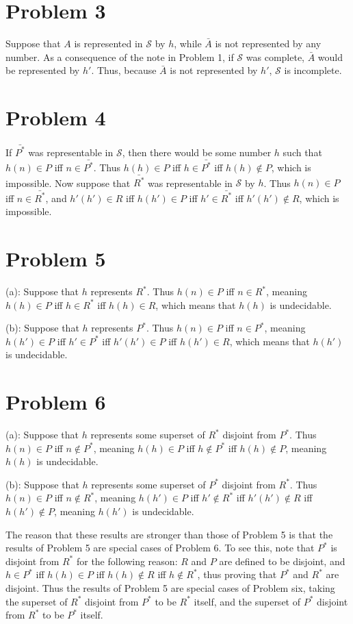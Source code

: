 \documentclass{article}
\theoremstyle{definition}
\begin{document}
\section*{Problem 3}
Suppose that $A$ is represented in $\mathcal{S}$ by $h$, while $\bar{A}$ is not represented by any number. As a consequence of the note in Problem 1, if 
$\mathcal{S}$ was complete, $\bar{A}$ would be represented by $h'$. Thus, because $\bar{A}$ is not represented by $h'$, $\mathcal{S}$ is incomplete. 

\section*{Problem 4}
If $\bar{P^*}$ was representable in $\mathcal{S}$, then there would be some number $h$ such that $h(n)\in P$ iff $n\in\bar{P^*}$. Thus 
$h(h)\in P$ iff $h\in\bar{P^*}$ iff $h(h)\notin P$, which is impossible. Now suppose that $\bar{R^*}$ was representable in $\mathcal{S}$ by $h$. 
Thus $h(n)\in P$ iff $n\in\bar{R^*}$, and $h'(h')\in R$ iff $h(h')\in P$ iff $h'\in\bar{R^*}$ iff $h'(h')\notin R$, which is impossible.

\section*{Problem 5}
(a): Suppose that $h$ represents $R^*$. Thus $h(n)\in P$ iff $n\in R^*$, meaning $h(h)\in P$ iff $h\in R^*$ iff $h(h)\in R$, which means that $h(h)$ is undecidable.


(b): Suppose that $h$ represents $P^*$. Thus $h(n)\in P$ iff $n\in P^*$, meaning $h(h')\in P$ iff $h'\in P^*$ iff $h'(h')\in P$ iff $h(h')\in R$, which means that 
$h(h')$ is undecidable.

\section*{Problem 6}
(a): Suppose that $h$ represents some superset of $R^*$ disjoint from $P^*$. Thus $h(n)\in P$ iff $n\notin P^*$, meaning $h(h)\in P$ iff $h\notin P^*$ iff 
$h(h)\notin P$, meaning $h(h)$ is undecidable.


(b): Suppose that $h$ represents some superset of $P^*$ disjoint from $R^*$. Thus $h(n)\in P$ iff $n\notin R^*$, meaning $h(h')\in P$ iff 
$h'\notin R^*$ iff $h'(h')\notin R$ iff $h(h')\notin P$, meaning $h(h')$ is undecidable.


The reason that these results are stronger than those of Problem 5 is that the results of Problem 5 are special cases of Problem 6. To see this, note that 
$P^*$ is disjoint from $R^*$ for the following reason: $R$ and $P$ are defined to be disjoint, and $h\in P^*$ iff $h(h)\in P$ iff $h(h)\notin R$ iff 
$h\notin R^*$, thus proving that $P^*$ and $R^*$ are disjoint. Thus the results of Problem 5 are special cases of Problem six, taking the superset of $R^*$ disjoint 
from $P^*$ to be $R^*$ itself, and the superset of $P^*$ disjoint from $R^*$ to be $P^*$ itself.
\end{document}

